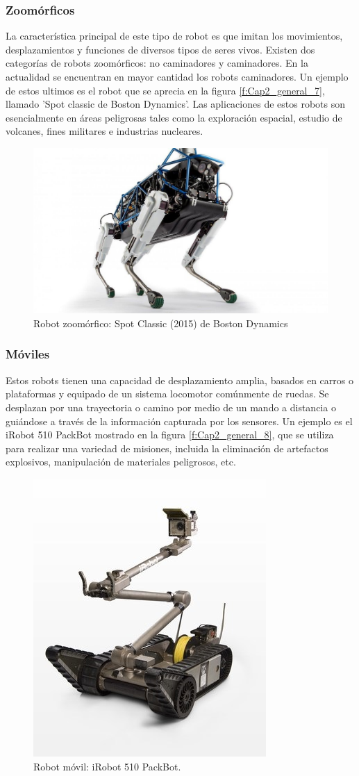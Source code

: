         \subsubsection{Zoomórficos}
        La característica principal de este tipo de robot es que imitan los movimientos, desplazamientos y funciones de diversos tipos de seres vivos. Existen dos categorías de robots zoomórficos: no caminadores y caminadores. En la actualidad se encuentran en mayor cantidad los robots caminadores. Un ejemplo de estos ultimos es el robot que se aprecia en la figura \eqref{f:Cap2_general_7}, llamado 'Spot classic de Boston Dynamics'. Las aplicaciones de estos robots son esencialmente en áreas peligrosas tales como la exploración espacial, estudio de volcanes, fines militares e industrias nucleares. 
        
        \begin{figure}[htb]
            \centering
            \includegraphics[width=0.48\linewidth]{Main/Chapter2/Images2/Robot-Zoomorico.jpg}
            \caption{Robot zoomórfico: Spot Classic (2015) de Boston Dynamics \cite{cap2_spotrobot}
 }
            \label{f:Cap2_general_7}
        \end{figure}
        
        \newpage
        
        \subsubsection{Móviles}
        Estos robots tienen una capacidad de desplazamiento amplia, basados en carros o plataformas y equipado de un sistema locomotor comúnmente de ruedas. Se desplazan por una trayectoria o camino por medio de un mando a distancia o guiándose a través de la información capturada por los sensores. Un ejemplo es el iRobot 510 PackBot mostrado en la figura \eqref{f:Cap2_general_8}, que se utiliza para realizar una variedad de misiones, incluida la eliminación de artefactos explosivos, manipulación de materiales peligrosos, etc.
        
        \begin{figure}[htb]
            \centering
            \includegraphics[width=0.27\linewidth]{Main/Chapter2/Images2/Robots-moviles.jpg}
            \caption{Robot móvil: 
            iRobot 510 PackBot.\cite{cap2_iRobot510}}
            \label{f:Cap2_general_8}
        \end{figure}
        
